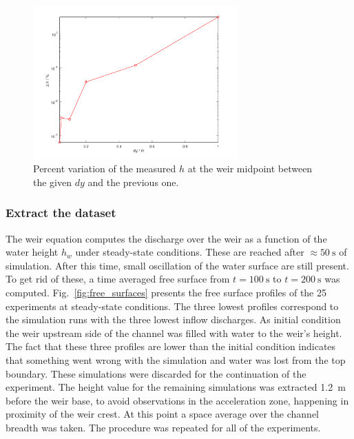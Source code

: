\begin{figure}[h]
  \centering
  \includegraphics[width=0.7\textwidth]{Figures/diff_center.png}
  \caption{Percent variation of the measured $h$ at the weir midpoint between the given $dy$ and the previous one.}
  \label{fig:diff_center}
\end{figure}


\subsubsection{Extract the dataset}
The weir equation computes the discharge over the weir as a function of the water height $h_w$ under steady-state conditions.
These are reached after $\approx \SI{50}{\s}$ of simulation.
After this time, small oscillation of the water surface are still present.
To get rid of these, a time averaged free surface from $t = \SI{100}{\s}$ to $t = \SI{200}{\s}$ was computed.
Fig.~\ref{fig:free_surfaces} presents the free surface profiles of the \num{25} experiments at steady-state conditions.
The three lowest profiles correspond to the simulation runs with the three lowest inflow discharges. 
As initial condition the weir upstream side of the channel was filled with water to the weir's height.
The fact that these three profiles are lower than the initial condition indicates that something went wrong with the simulation and water was lost from the top boundary.
These simulations were discarded for the continuation of the experiment.
The height value for the remaining simulations was extracted \SI{1.2}{\m} before the weir base, to avoid observations in the acceleration zone, happening in proximity of the weir crest.
At this point a space average over the channel breadth was taken.
The procedure was repeated for all of the experiments.

